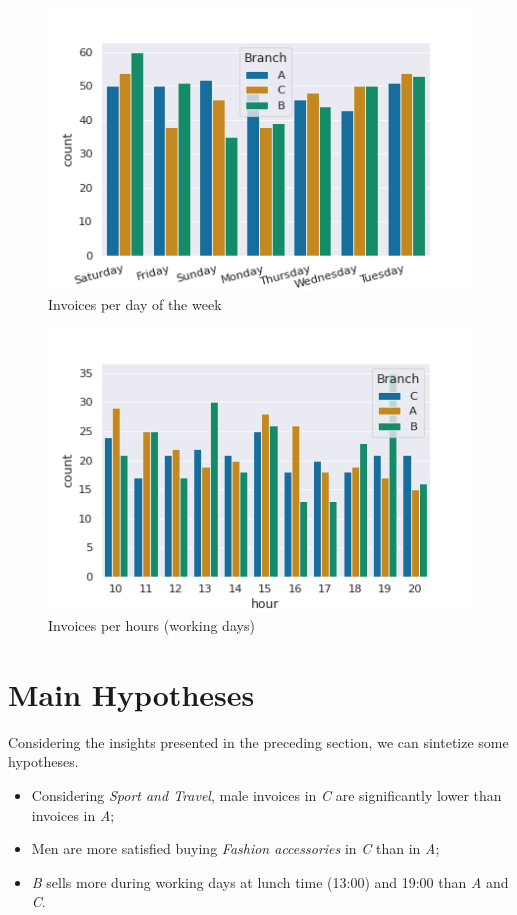 \documentclass[11pt, a4]{article}
\begin{document}
\begin{figure}[!h]
\includegraphics[scale=0.8]{week}
\centering
\caption{Invoices per day of the week}
\label{fig:week}
\end{figure}

\begin{figure}[!h]
\includegraphics[scale=0.8]{hour}
\centering
\caption{Invoices per hours (working days)}
\label{fig:hour}
\end{figure}


\section*{Main Hypotheses}

Considering the insights presented in the preceding section, we can sintetize some hypotheses.

\begin{itemize}
\item Considering \textit{Sport and Travel}, male invoices in \textit{C} are significantly lower than invoices in \textit{A};\\
\item Men are more satisfied buying \textit{Fashion accessories} in \textit{C} than in \textit{A};\\
\item \textit{B} sells more during working days at lunch time (13:00) and 19:00 than \textit{A} and \textit{C}. 
\end{itemize}
\end{document}
